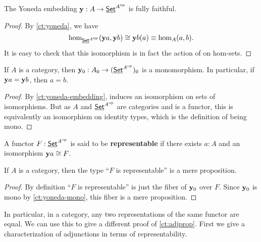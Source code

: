 \begin{cor}\label{ct:yoneda-embedding}
  The Yoneda embedding $\mathbf{y} :A\to \underline{\mathsf{Set}}^{A^{\textrm{op}}}$ is fully faithful.
\end{cor}
\begin{proof}
  By \autoref{ct:yoneda}, we have
  \[ \hom_{\underline{\mathsf{Set}}^{A^{\textrm{op}}}}(\mathbf{y} a, \mathbf{y} b) \cong \mathbf{y} b(a) \equiv \hom_A(a,b). \]
  It is easy to check that this isomorphism is in fact the action of \y on hom-sets.
\end{proof}

\begin{cor}\label{ct:yoneda-mono}
  If $A$ is a category, then $\mathbf{y}_0 : A_0 \to (\underline{\mathsf{Set}}^{A^{\textrm{op}}})_0$ is a monomorphism.
  In particular, if $\mathbf{y} a = \mathbf{y} b$, then $a=b$.
\end{cor}
\begin{proof}
  By \autoref{ct:yoneda-embedding}, \y induces an isomorphism on sets of isomorphisms.
  But as $A$ and $\underline{\mathsf{Set}}^{A^{\textrm{op}}}$ are categories and \y is a functor, this is equivalently an isomorphism on identity types, which is the definition of being mono.
\end{proof}

\begin{defn}\label{ct:representable}
  A functor $F:\underline{\mathsf{Set}}^{A^{\textrm{op}}}$ is said to be \textbf{representable} if there exists $a:A$ and an isomorphism $\mathbf{y} a \cong F$.
\end{defn}

\begin{thm}\label{ct:representable-prop}
  If $A$ is a category, then the type ``$F$ is representable'' is a mere proposition.
\end{thm}
\begin{proof}
  By definition ``$F$ is representable'' is just the fiber of $\mathbf{y}_0$ over $F$.
  Since $\mathbf{y}_0$ is mono by \autoref{ct:yoneda-mono}, this fiber is a mere proposition.
\end{proof}

In particular, in a category, any two representations of the same functor are equal.
We can use this to give a different proof of \autoref{ct:adjprop}.
First we give a characterization of adjunctions in terms of representability.

